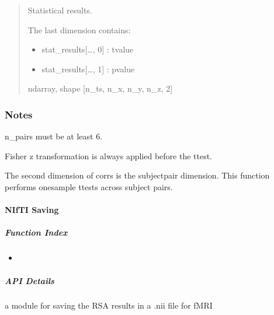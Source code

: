 \documentclass[letterpaper,10pt,english]{sphinxhowto}
\begin{document}
\begin{fulllineitems}
\begin{quote}
\begin{description}
\sphinxAtStartPar

\sphinxAtStartPar
{} \textendash{} Statistical results.

\sphinxAtStartPar
The last dimension contains:
\begin{itemize}
\item {} 
\sphinxAtStartPar
stat\_results{[}…, 0{]} : t\sphinxhyphen{}value

\item {} 
\sphinxAtStartPar
stat\_results{[}…, 1{]} : p\sphinxhyphen{}value

\end{itemize}


\sphinxAtStartPar
ndarray, shape {[}n\_ts, n\_x, n\_y, n\_z, 2{]}

\end{description}\end{quote}
\subsubsection*{Notes}

\sphinxAtStartPar
n\_pairs must be at least 6.

\sphinxAtStartPar
Fisher z transformation is always applied before the t\sphinxhyphen{}test.

\sphinxAtStartPar
The second dimension of corrs is the subject\sphinxhyphen{}pair dimension.
This function performs one\sphinxhyphen{}sample t\sphinxhyphen{}tests across subject pairs.

\end{fulllineitems}


\sphinxstepscope

\clearpage


\paragraph{NIfTI Saving}
\label{\detokenize{nii_save:nifti-saving}}\label{\detokenize{nii_save::doc}}
\sphinxAtStartPar
{}


\subparagraph{Function Index}
\label{\detokenize{nii_save:function-index}}\begin{itemize}
\item {} 
\sphinxAtStartPar
{}

\end{itemize}


\subparagraph{API Details}
\label{\detokenize{nii_save:module-neurora.nii_save}}\label{\detokenize{nii_save:api-details}}
\sphinxAtStartPar
a module for saving the RSA results in a .nii file for fMRI
\end{document}
